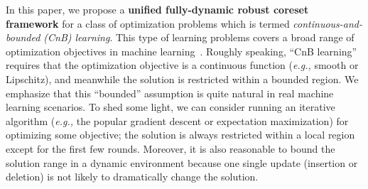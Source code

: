 \documentclass{article}
\begin{document}

In this paper, we propose a  \textbf{unified fully-dynamic robust coreset framework} for a class of optimization problems which is termed \emph{continuous-and-bounded (CnB) learning}. This type of learning problems covers a broad range of optimization objectives in machine learning~\cite[Chapter 12.2.2]{understandingML}. Roughly speaking, ``CnB learning'' requires that the optimization objective is a continuous function ({\em e.g.,} smooth or Lipschitz), and meanwhile the solution is restricted within a bounded region. 
We emphasize that this ``bounded'' assumption  is quite natural in real machine learning scenarios.  
To shed some light, we can consider running an iterative algorithm ({\em e.g.,} the popular gradient descent or expectation maximization) for optimizing some objective; the solution is always restricted within a local region except for the first few rounds. 
Moreover, it is also reasonable to bound the solution range in a dynamic environment because one single update (insertion or deletion) is not likely to dramatically change the solution.  
\end{document}
